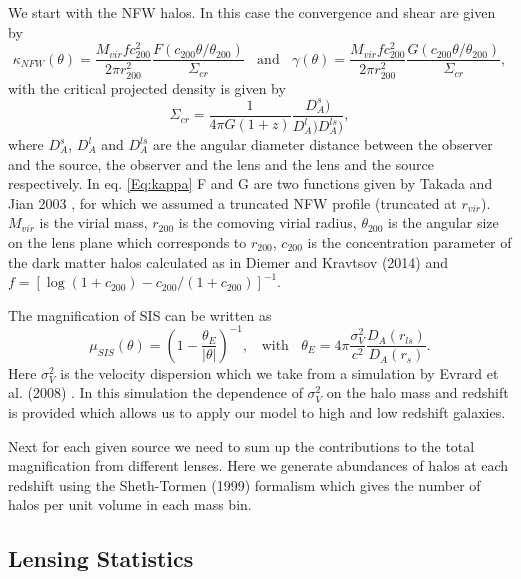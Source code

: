 \documentclass[12pt]{article}
\begin{document}
We start with the NFW halos. In this case the convergence and shear are given by 
\begin{equation}
\kappa_{NFW}(\theta) = \frac{M_{vir}fc_{200}^2}{2\pi r_{200}^2}\frac{F\left(c_{200}\theta/\theta_{200}\right)}{\Sigma_{cr}}~~~~\textrm{and}~~~~\gamma(\theta) = \frac{M_{vir}f c_{200}^2}{2\pi r_{200}^2}\frac{G\left(c_{200}\theta/\theta_{200}\right)}{\Sigma_{cr}},
\label{Eq:kappa}\end{equation}
with  the critical projected density is given by  
\begin{equation}
\Sigma_{cr} = \frac{1}{4\pi G(1+z)}\frac{D_A^s)}{D_A^l)D_A^{ls})},
\end{equation}
where $D_A^s$, $D_A^l$ and $D_A^{ls}$  are the angular diameter distance between the observer and the source,  the observer and the lens and the lens and the source respectively. In eq.  \ref{Eq:kappa}  F and G are two functions given by Takada and Jian 2003 \cite{Takada:2003}, for which we assumed a truncated NFW profile (truncated at $r_{vir}$).  $M_{vir}$ is the virial mass, $r_{200}$ is the comoving virial radius, $\theta_{200}$ is the angular size on the lens plane which corresponds to  $r_{200}$, $c_{200}$ is the concentration parameter of the dark matter halos calculated as in Diemer and Kravtsov (2014) \cite{Diemer:2014} and  $f = \left[\log(1+c_{200})-c_{200}/(1+c_{200})\right]^{-1}$.

The magnification of SIS can be written as  
\begin{equation}
\mu_{SIS}(\theta)= \left(1-\frac{\theta_E}{|\theta|}\right)^{-1},~~~~\textrm{with}~~~~\theta_E = 4\pi\frac{\sigma_V^2}{c^2}\frac{D_{A}(r_{ls})}{D_A(r_s)}.
\end{equation}
Here $\sigma_V^2$ is the velocity  dispersion which we take from a simulation by Evrard et al. (2008) \cite{Evrard:2008}. In this simulation the dependence of $\sigma_V^2$ on the halo mass and redshift is provided which allows us to apply our model to high and low redshift galaxies. 

Next for each given source we need to sum up the contributions to the total magnification from different lenses. Here we generate abundances of halos at each redshift using the Sheth-Tormen (1999) \cite{Sheth:1999} formalism which gives the number of halos per unit volume in each mass bin. 
 


\subsection{Lensing Statistics}
\end{document}
